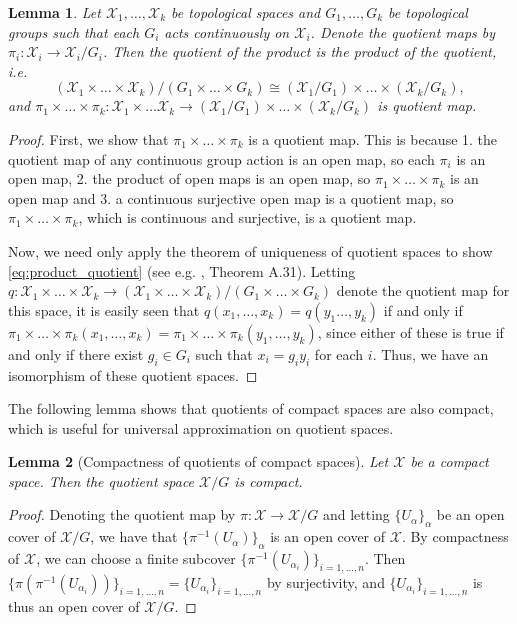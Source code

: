 \documentclass{article} \usepackage{iclr2023_conference,times}
\newcommand{\mc}[1]{\mathcal{#1}}
\newcommand{\X}{\mathcal{X}}
\newtheorem{lemma}{Lemma}
\begin{document}
\begin{lemma}\label{lem:product_quotient}
    Let $\mc X_1, \ldots, \mc X_k$ be topological spaces and $G_1, \ldots, G_k$ be topological groups such that each $G_i$ acts continuously on $\mc X_i$. Denote the quotient maps by $\pi_i: \mc X_i \to \mc X_i / G_i$. Then the quotient of the product is the product of the quotient, i.e.
    \begin{equation}\label{eq:product_quotient}
        (\mc X_1 \times \ldots \times \mc X_k) / (G_1 \times \ldots \times G_k) \cong (\mc X_1 / G_1) \times \ldots \times (\mc X_k / G_k),
    \end{equation}
    and $\pi_1 \times \ldots \times \pi_k: \mc X_1 \times \ldots \mc X_k \to (\mc X_1 / G_1) \times \ldots \times (\mc X_k / G_k)$  is quotient map.
\end{lemma}
\begin{proof}
    First, we show that $\pi_1 \times \ldots \times \pi_k$ is a quotient map. This is because 1. the quotient map of any continuous group action is an open map, so each $\pi_i$ is an open map, 2. the product of open maps is an open map, so $\pi_1 \times \ldots \times \pi_k$ is an open map and 3. a continuous surjective open map is a quotient map, so $\pi_1 \times \ldots \times \pi_k$, which is continuous and surjective, is a quotient map.

    Now, we need only apply the theorem of uniqueness of quotient spaces to show \eqref{eq:product_quotient} (see e.g. \cite{lee2013smooth}, Theorem A.31). Letting $q: \mc X_1 \times \ldots \times \mc X_k \to (\mc X_1 \times \ldots \times \mc X_k) / (G_1 \times \ldots \times G_k)$ denote the quotient map for this space, it is easily seen that $q(x_1, \ldots, x_k) = q(y_1 \ldots, y_k) $ if and only if $\pi_1 \times \ldots \times \pi_k(x_1, \ldots, x_k) = \pi_1 \times \ldots \times \pi_k(y_1, \ldots, y_k)$, since either of these is true if and only if there exist $g_i \in G_i$ such that $x_i = g_i y_i$ for each $i$. Thus, we have an isomorphism of these quotient spaces.
\end{proof}

The following lemma shows that quotients of compact spaces are also compact, which is useful for universal approximation on quotient spaces.

\begin{lemma}[Compactness of quotients of compact spaces]\label{lem:quotient_compact}
    Let $\X$ be a compact space. Then the quotient space $\X/G$ is compact.
\end{lemma}
\begin{proof}
    Denoting the quotient map by $\pi: \X \to \X/G$ and letting $\{U_\alpha\}_\alpha$ be an open cover of $\X/G$, we have that $\{\pi^{-1}(U_\alpha)\}_\alpha$ is an open cover of $\X$. By compactness of $\X$, we can choose a finite subcover $\{\pi^{-1}(U_{\alpha_i})\}_{i=1, \ldots, n}$. Then $\{\pi(\pi^{-1}(U_{\alpha_i}))\}_{i=1, \ldots, n} = \{U_{\alpha_i}\}_{i=1, \ldots, n}$ by surjectivity, and $\{U_{\alpha_i}\}_{i=1, \ldots, n}$ is thus an open cover of $\mc X/G$.
\end{proof}
\end{document}
